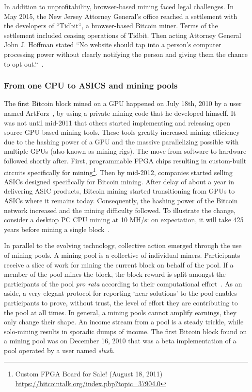 In addition to unprofitability, browser-based mining faced legal challenges. In May 2015, the New Jersey Attorney General's office reached a settlement with the developers of ``Tidbit``, a browser-based Bitcoin miner. Terms of the settlement included ceasing operations of Tidbit. Then acting Attorney General John J. Hoffman stated ``No website should tap into a person's computer processing power without clearly notifying the person and giving them the chance to opt out.``~\cite{njcourtbitcoinjsminer}.

\subsubsection{From one CPU to ASICS and mining pools}


The first Bitcoin block mined on a GPU happened on July 18th, 2010 by a user named ArtForz~\cite{bitcoinhistory}, by using a private mining code that he developed himself. It was not until mid-2011 that others started implementing and releasing open source GPU-based mining tools. These tools greatly increased mining efficiency due to the hashing power of a GPU and the massive parallelizing possible with multiple GPUs (also known as mining rigs). The move from software to hardware followed shortly after. First, programmable FPGA chips resulting in custom-built circuits specifically for mining\footnote{Custom FPGA Board for Sale! (August 18, 2011) \url{https://bitcointalk.org/index.php?topic=37904.0}}. Then by mid-2012, companies started selling ASICs designed specifically for Bitcoin mining. After delay of about a year in delivering ASIC products, Bitcoin mining started transitioning from GPUs to ASICs where it remains today. Consequently, the hashing power of the Bitcoin network increased and the mining difficulty followed. To illustrate the change, consider a desktop PC CPU mining at 10 MH/s: on expectation, it will take 425 years before mining a single block~\cite{huang2014botcoin}. 

In parallel to the evolving technology, collective action emerged through the use of mining pools. A mining pool is a collective of individual miners. Participants receive a slice of work for mining the current block on behalf of the pool. If a member of the pool mines the block, the block reward is split amongst the participants of the pool \textit{pro rata} according to their computational effort~\cite{rosenfeld2011analysis}. As an aside, a very elegant protocol for reporting `near-solutions' to the pool enables participants to prove, without trust, the level of effort they are contributing to the pool at all times. In general, a mining pools cannot amplify earnings, they only change their shape. An income stream from a pool is a steady trickle, while solo-mining results in sporadic dumps of income. The first Bitcoin block found on a mining pool was on December 16, 2010 that was a beta implementation of a pool operated by a user named \textit{slush}.

